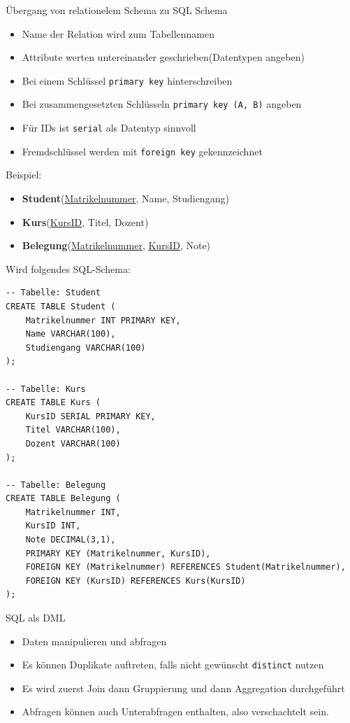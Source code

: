 \documentclass{article}
\begin{document}
\begin{block}{Übergang von relationelem Schema zu SQL Schema}
  \begin{itemize}
    \item Name der Relation wird zum Tabellennamen
    \item Attribute werten untereinander geschrieben(Datentypen angeben)
    \item Bei einem Schlüssel \texttt{primary key} hinterschreiben
    \item Bei zusammengesetzten Schlüsseln \texttt{primary key (A, B)} angeben
    \item Für IDs ist \texttt{serial} als Datentyp sinnvoll
    \item Fremdschlüssel werden mit \texttt{foreign key} gekennzeichnet
  \end{itemize}
\end{block}
Beispiel:
\begin{itemize}
  \item \textbf{Student}(\underline{Matrikelnummer}, Name, Studiengang)
  \item \textbf{Kurs}(\underline{KursID}, Titel, Dozent)
  \item \textbf{Belegung}(\underline{Matrikelnummer}, \underline{KursID}, Note)
\end{itemize}
Wird folgendes SQL-Schema:
\begin{lstlisting}
-- Tabelle: Student
CREATE TABLE Student (
    Matrikelnummer INT PRIMARY KEY,
    Name VARCHAR(100),
    Studiengang VARCHAR(100)
);

-- Tabelle: Kurs
CREATE TABLE Kurs (
    KursID SERIAL PRIMARY KEY,
    Titel VARCHAR(100),
    Dozent VARCHAR(100)
);

-- Tabelle: Belegung
CREATE TABLE Belegung (
    Matrikelnummer INT,
    KursID INT,
    Note DECIMAL(3,1),
    PRIMARY KEY (Matrikelnummer, KursID),
    FOREIGN KEY (Matrikelnummer) REFERENCES Student(Matrikelnummer),
    FOREIGN KEY (KursID) REFERENCES Kurs(KursID)
);
\end{lstlisting}

\begin{block}{SQL als DML}
  \begin{itemize}
    \item Daten manipulieren und abfragen
    \item Es können Duplikate auftreten, falls nicht gewünscht \texttt{distinct} nutzen
    \item Es wird zuerst Join dann Gruppierung und dann Aggregation durchgeführt
    \item Abfragen können auch Unterabfragen enthalten, also verschachtelt sein.
  \end{itemize}
\end{block}
\end{document}
